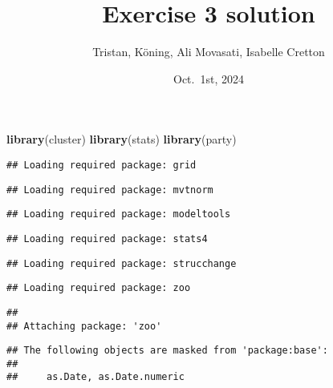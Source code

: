 \documentclass[
]{article}
\title{Exercise 3 solution}
\author{Tristan, Köning, Ali Movasati, Isabelle Cretton}
\date{Oct.~1st, 2024}
\newenvironment{Shaded}{\begin{snugshade}}{\end{snugshade}}
\newcommand{\AttributeTok}[1]{\textcolor[rgb]{0.13,0.29,0.53}{#1}}
\newcommand{\CommentTok}[1]{\textcolor[rgb]{0.56,0.35,0.01}{\textit{#1}}}
\newcommand{\ConstantTok}[1]{\textcolor[rgb]{0.56,0.35,0.01}{#1}}
\newcommand{\FunctionTok}[1]{\textcolor[rgb]{0.13,0.29,0.53}{\textbf{#1}}}
\newcommand{\NormalTok}[1]{#1}
\newcommand{\SpecialCharTok}[1]{\textcolor[rgb]{0.81,0.36,0.00}{\textbf{#1}}}
\begin{document}
\maketitle

\begin{Shaded}
\end{Shaded}

\begin{Shaded}
\begin{Highlighting}[]
\FunctionTok{library}\NormalTok{(cluster)}
\FunctionTok{library}\NormalTok{(stats)}
\FunctionTok{library}\NormalTok{(party)}
\end{Highlighting}
\end{Shaded}

\begin{verbatim}
## Loading required package: grid
\end{verbatim}

\begin{verbatim}
## Loading required package: mvtnorm
\end{verbatim}

\begin{verbatim}
## Loading required package: modeltools
\end{verbatim}

\begin{verbatim}
## Loading required package: stats4
\end{verbatim}

\begin{verbatim}
## Loading required package: strucchange
\end{verbatim}

\begin{verbatim}
## Loading required package: zoo
\end{verbatim}

\begin{verbatim}
## 
## Attaching package: 'zoo'
\end{verbatim}

\begin{verbatim}
## The following objects are masked from 'package:base':
## 
##     as.Date, as.Date.numeric
\end{verbatim}
\end{document}
